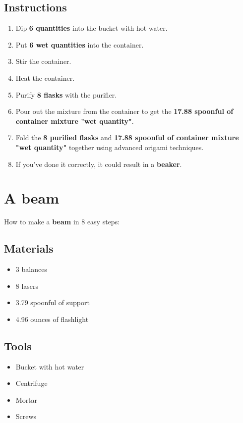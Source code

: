 \documentclass{article}
\begin{document}
\subsection{Instructions}\begin{enumerate}
\item 
Dip \textbf{6 quantities} into the bucket with hot water.
\item 
Put \textbf{6 wet quantities} into the container.
\item 
Stir the container.
\item 
Heat the container.
\item 
Purify \textbf{8 flasks} with the purifier.
\item 
Pour out the mixture from the container to get the \textbf{17.88 spoonful of container mixture "wet quantity"}.
\item 
Fold the \textbf{8 purified flasks} and \textbf{17.88 spoonful of container mixture "wet quantity"} together using advanced origami techniques.
\item 
If you've done it correctly, it could result in a \textbf{beaker}.
\end{enumerate}
\newpage
\section{A beam}How to make a \textbf{beam} in 8 easy steps:

\subsection{Materials}\begin{itemize}
\item 
3 balances
\item 
8 lasers
\item 
3.79 spoonful of support
\item 
4.96 ounces of flashlight
\end{itemize}
\subsection{Tools}\begin{itemize}
\item 
Bucket with hot water
\item 
Centrifuge
\item 
Mortar
\item 
Screws
\end{itemize}
\end{document}
